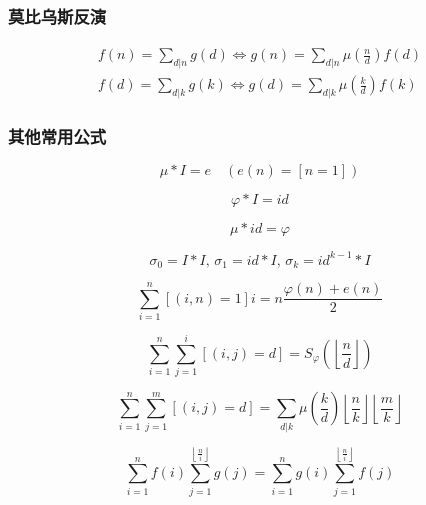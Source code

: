 \subsubsection{莫比乌斯反演}
	$$ \begin{aligned}
		f(n) = \sum_{d | n} g(d) \Leftrightarrow g(n) = \sum_{d | n} \mu\left( \frac n d \right) f(d) \\
		f(d) = \sum_{d | k} g(k) \Leftrightarrow g(d) = \sum_{d | k} \mu\left( \frac k d \right) f(k)
	\end{aligned} $$

\subsubsection{其他常用公式}
	$$\mu * I = e \quad (e(n) = [n = 1])$$

	$$\varphi * I = id $$

	$$\mu * id = \varphi $$

	$$\sigma_0 = I * I ,\, \sigma_1 = id * I ,\, \sigma_k = id^{k - 1} * I$$

	$$\sum_{i = 1} ^ n \left[(i, n) = 1\right] i = n \frac {\varphi(n) + e(n)} 2$$
	
	$$\sum_{i = 1} ^ n \sum_{j = 1} ^ i \left[(i, j) = d\right] = S_\varphi \left( \left\lfloor \frac n d \right\rfloor \right)$$

	$$\sum_{i = 1} ^ n \sum_{j = 1} ^ m \left[(i, j) = d\right] = \sum_{d | k} \mu\left( \frac k d \right) \left\lfloor \frac n k \right\rfloor \left\lfloor \frac m k \right\rfloor$$

	$$ \sum_{i = 1} ^ n f(i) \sum_{j = 1} ^ {\left\lfloor \frac n i \right\rfloor} g(j) = \sum_{i = 1} ^ n g(i) \sum_{j = 1} ^ {\left\lfloor \frac n i \right\rfloor} f(j) $$